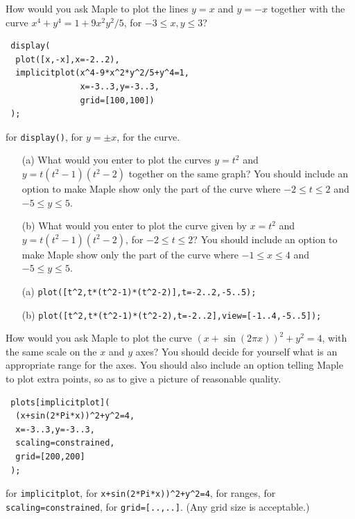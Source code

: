 \documentclass[a4paper]{article}
\begin{document}
\begin{problem}\label{ex-implicitplot-iii}
 How would you ask Maple to plot the lines $y=x$ and $y=-x$
 together with the curve $x^4+y^4=1+9x^2y^2/5$, for
 $-3\leq x,y\leq 3$?  
\end{problem}
\begin{solution}
\begin{verbatim}
 display(
  plot([x,-x],x=-2..2),
  implicitplot(x^4-9*x^2*y^2/5+y^4=1,
               x=-3..3,y=-3..3,
               grid=[100,100])
 ); 
\end{verbatim}
 \mk for \verb~display()~,  for $y=\pm x$,  for
 the curve.
\end{solution}

\begin{problem}
 \begin{itemize}
  \item[(a)] What would you enter to plot the curves
   $y=t^2$ and $y=t(t^2-1)(t^2-2)$ together on the same
   graph?  You should include an option to make Maple show only the
   part of the curve where $-2\leq t\leq 2$ and $-5\leq y\leq 5$. 
  \item[(b)] What would you enter to plot the curve given by
   $x=t^2$ and $y=t(t^2-1)(t^2-2)$, for $-2\leq t\leq 2$?
   You should include an option to make Maple show only the part of
   the curve where $-1\leq x\leq 4$ and $-5\leq y\leq 5$.  
 \end{itemize}
\end{problem}
\begin{solution}
 \begin{itemize}
  \item[(a)]
   \verb~plot([t^2,t*(t^2-1)*(t^2-2)],t=-2..2,-5..5);~
  \item[(b)]
   \verb~plot([t^2,t*(t^2-1)*(t^2-2),t=-2..2],view=[-1..4,-5..5]);~
 \end{itemize}
\end{solution}

\begin{problem}\label{ex-implicitplot-ii}
 How would you ask Maple to plot the curve
 $(x+\sin(2\pi x))^2+y^2=4$, with the same scale on the $x$
 and $y$ axes?  You should decide for yourself what is an
 appropriate range for the axes.  You should also include an
 option telling Maple to plot extra points, so as to give a
 picture of reasonable quality.  
\end{problem}
\begin{solution}
\begin{verbatim}
 plots[implicitplot](
  (x+sin(2*Pi*x))^2+y^2=4,
  x=-3..3,y=-3..3,
  scaling=constrained,
  grid=[200,200]
 );
\end{verbatim}
 \mk for \verb~implicitplot~, \mk for
 \verb~x+sin(2*Pi*x))^2+y^2=4~, \mk for ranges, \mk
 for \verb~scaling=constrained~, \mk for
 \verb~grid=[..,..]~.  (Any grid size is acceptable.)
\end{solution}
\end{document}
